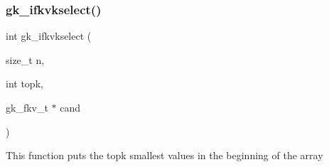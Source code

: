 \subsubsection{\texorpdfstring{gk\+\_\+ifkvkselect()}{gk\_ifkvkselect()}}
{\footnotesize\ttfamily int gk\+\_\+ifkvkselect (\begin{DoxyParamCaption}\item[{size\+\_\+t}]{n,  }\item[{int}]{topk,  }\item[{gk\+\_\+fkv\+\_\+t $\ast$}]{cand }\end{DoxyParamCaption})}

This function puts the \textquotesingle{}topk\textquotesingle{} smallest values in the beginning of the array 